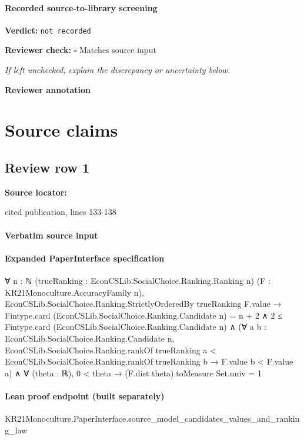 \documentclass[10pt]{article}
\newcommand{\reviewerbox}{%
  \par\noindent\fbox{\parbox{0.96\linewidth}{\rule{0pt}{0.38in}}}\par
}
\newcommand{\reviewmatch}[1]{%
  \par\noindent\textbf{Reviewer check:} $\square$\; #1\par
  \noindent\emph{If left unchecked, explain the discrepancy or uncertainty below.}\par
}
\begin{document}
\paragraph{Recorded source-to-library screening}
\textbf{Verdict:} \texttt{not recorded}
\reviewmatch{Matches source input}
\noindent\textbf{Reviewer annotation}\par
\reviewerbox

\clearpage
\hypertarget{source-claim-70a4d7b84f526fcd}{}
\hypertarget{source-section-f10b5f68e4acf3dc}{}
\section*{Source claims}
\subsection*{Review row 1}
\textbf{Source locator:} {\footnotesize\raggedright cited publication, lines 133-\allowbreak{}138\par}
\paragraph{Verbatim source input}
\begin{ReviewVerbatim}
\end{ReviewVerbatim}


\paragraph{Expanded PaperInterface specification}
\begin{ReviewVerbatim}
∀ {n : ℕ} (trueRanking : EconCSLib.SocialChoice.Ranking.Ranking n) (F : KR21Monoculture.AccuracyFamily n),
  EconCSLib.SocialChoice.Ranking.StrictlyOrderedBy trueRanking F.value →
    Fintype.card (EconCSLib.SocialChoice.Ranking.Candidate n) = n + 2 ∧
      2 ≤ Fintype.card (EconCSLib.SocialChoice.Ranking.Candidate n) ∧
        (∀ {a b : EconCSLib.SocialChoice.Ranking.Candidate n},
            EconCSLib.SocialChoice.Ranking.rankOf trueRanking a < EconCSLib.SocialChoice.Ranking.rankOf trueRanking b →
              F.value b < F.value a) ∧
          ∀ (theta : ℝ), 0 < theta → (F.dist theta).toMeasure Set.univ = 1
\end{ReviewVerbatim}

\paragraph{Lean proof endpoint (built separately)}\begin{ReviewVerbatim}
KR21Monoculture.PaperInterface.source_model_candidates_values_and_ranking_law
\end{ReviewVerbatim}
\end{document}

